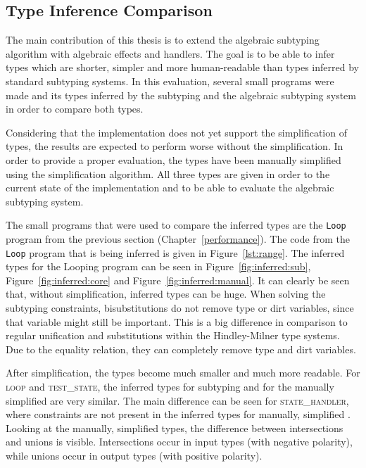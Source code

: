 \subsection{Type Inference Comparison}

The main contribution of this thesis is to extend the algebraic subtyping algorithm with algebraic effects and handlers. The goal is to be able to infer types which are shorter, simpler and more human-readable than types inferred by standard subtyping systems. In this evaluation, several small programs were made and its types inferred by the subtyping and the algebraic subtyping system in order to compare both types. 

Considering that the implementation does not yet support the simplification of types, the results are expected to perform worse without the simplification. In order to provide a proper evaluation, the types have been manually simplified using the simplification algorithm. All three types are given in order to the current state of the implementation and to be able to evaluate the algebraic subtyping system.

The small programs that were used to compare the inferred types are the \texttt{Loop} program from the previous section (Chapter~\ref{performance}). The code from the \texttt{Loop} program that is being inferred is given in Figure~\ref{lst:range}. The inferred types for the Looping program can be seen in Figure~\ref{fig:inferred:sub}, Figure~\ref{fig:inferred:core} and Figure~\ref{fig:inferred:manual}. It can clearly be seen that, without simplification, inferred types can be huge. When solving the subtyping constraints, bisubstitutions do not remove type or dirt variables, since that variable might still be important. This is a big difference in comparison to regular unification and substitutions within the Hindley-Milner type systems. Due to the equality relation, they can completely remove type and dirt variables. 

After simplification, the types become much smaller and much more readable. For \textsc{loop} and \textsc{test\_state}, the inferred types for subtyping and for the manually simplified \core are very similar. The main difference can be seen for \textsc{state\_handler}, where constraints are not present in the inferred types for manually, simplified \core. Looking at the manually, simplified \core types, the difference between intersections and unions is visible. Intersections occur in input types (with negative polarity), while unions occur in output types (with positive polarity).

